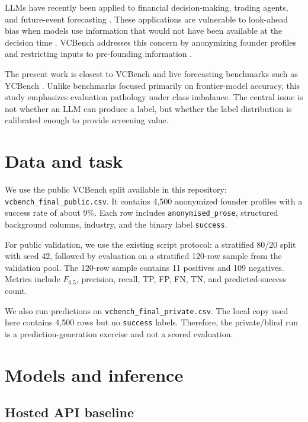 \documentclass{article}
\begin{document}
LLMs have recently been applied to financial decision-making, trading agents,
and future-event forecasting \citep{benhenda2025finrl,xu2025defi,zeng2025futurex,chandak2026future}.
These applications are vulnerable to look-ahead bias when models use information
that would not have been available at the decision time
\citep{benhenda2026lookahead}. VCBench addresses this concern by anonymizing
founder profiles and restricting inputs to pre-founding information
\citep{chen2025vcbench}.

The present work is closest to VCBench and live forecasting benchmarks such as
YCBench \citep{benhenda2026ycbench}. Unlike benchmarks focused primarily on
frontier-model accuracy, this study emphasizes evaluation pathology under class
imbalance. The central issue is not whether an LLM can produce a label, but
whether the label distribution is calibrated enough to provide screening value.

\section{Data and task}

We use the public VCBench split available in this repository:
\texttt{vcbench\_final\_public.csv}. It contains 4,500 anonymized founder
profiles with a success rate of about 9\%. Each row includes
\texttt{anonymised\_prose}, structured background columns, industry, and the
binary label \texttt{success}.

For public validation, we use the existing script protocol: a stratified 80/20
split with seed 42, followed by evaluation on a stratified 120-row sample from
the validation pool. The 120-row sample contains 11 positives and 109 negatives.
Metrics include $F_{0.5}$, precision, recall, TP, FP, FN, TN, and
predicted-success count.

We also run predictions on \texttt{vcbench\_final\_private.csv}. The local copy
used here contains 4,500 rows but no \texttt{success} labels. Therefore, the
private/blind run is a prediction-generation exercise and not a scored
evaluation.

\section{Models and inference}

\subsection{Hosted API baseline}
\end{document}
